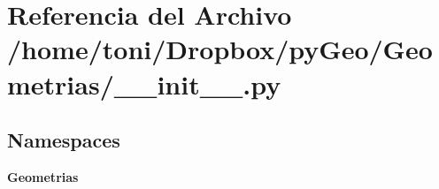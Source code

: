 \section{Referencia del Archivo /home/toni/\-Dropbox/py\-Geo/\-Geometrias/\-\_\-\-\_\-init\-\_\-\-\_\-.py}
\label{Geometrias_2____init_____8py}
\subsection*{Namespaces}
\begin{DoxyCompactItemize}
\item 
{\bf Geometrias}
\end{DoxyCompactItemize}

